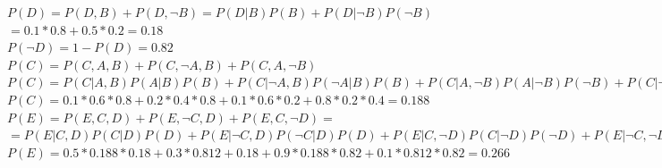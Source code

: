 \documentclass{article}
\begin{document}
\begin{itemize}
$P(D) = P(D,B) + P(D,\neg B) = P(D|B)P(B) + P(D|\neg B)P(\neg B)$\\
$= 0.1*0.8 + 0.5*0.2 = 0.18$\\

$P(\neg D) = 1 - P(D) = 0.82$\\

$P(C) = P(C,A,B)+ P(C,\neg A, B) + P(C,A,\neg B)$\\
$P(C) = P(C|A,B)P(A|B)P(B) + P(C|\neg A,B)P(\neg A|B)P(B) + P(C|A,\neg B)P(A|\neg B)P(\neg B) + P(C|\neg A,\neg B)P(\neg A|\neg B)P(\neg B)$\\
$P(C) = 0.1*0.6*0.8 + 0.2*0.4*0.8 + 0.1*0.6*0.2 + 0.8*0.2*0.4 = 0.188$\\

$P(E) = P(E,C,D)+P(E,\neg C,D)+P(E,C,\neg D) =$\\
$= P(E|C,D)P(C|D)P(D) + P(E|\neg C,D)P(\neg C|D)P(D) + P(E|C, \neg D)P(C|\neg D)P(\neg D) + P(E|\neg C, \neg D)P(\neg C|\neg D)P(\neg D)$\\
$P(E) = 0.5*0.188*0.18 + 0.3*0.812+0.18 + 0.9*0.188*0.82 + 0.1*0.812*0.82 = 0.266$

\end{itemize}
\end{document}
